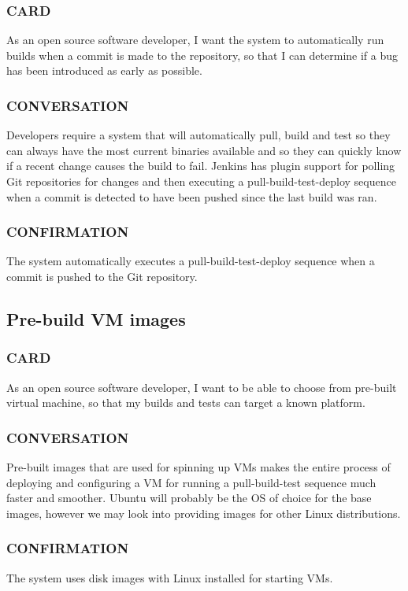 \documentclass[10pt,letterpaper,onecolumn,journal]{IEEEtran}
\begin{document}
\subsubsection{CARD}
As an open source software developer, I want the system to automatically run builds when a commit is made to the repository, so that I can determine if a bug has been introduced as early as possible.
\subsubsection{CONVERSATION}
Developers require a system that will automatically pull, build and test so they can always have the most current
binaries available and so they can quickly know if a recent change causes the build to fail. Jenkins has plugin support for polling
Git repositories for changes and then executing a pull-build-test-deploy sequence when a commit is detected to have been pushed since
the last build was ran.
\subsubsection{CONFIRMATION}
The system automatically executes a pull-build-test-deploy sequence when a commit is pushed to the Git repository.

\subsection{Pre-build VM images}
\subsubsection{CARD}
As an open source software developer, I want to be able to choose from pre-built virtual machine, so that my builds and tests can target a known platform. 
\subsubsection{CONVERSATION}
Pre-built images that are used for spinning up VMs makes the entire process of deploying and configuring a VM
for running a pull-build-test sequence much faster and smoother. Ubuntu will probably be the OS of choice for the base images, however
we may look into providing images for other Linux distributions.
\subsubsection{CONFIRMATION}
The system uses disk images with Linux installed for starting VMs.
\clearpage


\clearpage
\end{document}
